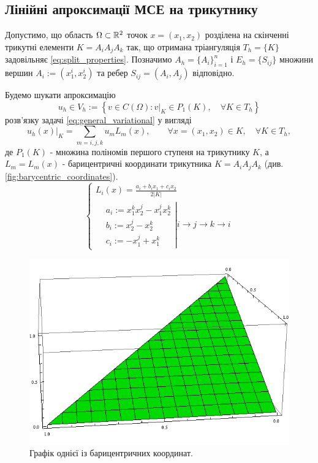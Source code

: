 \subsection{Лінійні апроксимації МСЕ на трикутнику}

Допустимо, що область $\Omega \subset \mathbb{R}^2$ точок $x = (x_1, x_2)$ розділена на скінченні трикутні елементи $K = A_iA_jA_k$
	так, що отримана тріангуляція $T_h = \lbrace K \rbrace$ задовільняє
\eqref{eq:split_properties}.
Позначимо $A_h = \lbrace A_i \rbrace_{i=1}^n$ і $E_h = \lbrace S_{ij} \rbrace$ множини вершин $A_i := (x_1^i, x_2^i)$ та ребер $S_{ij} = (A_i, A_j)$ відповідно.

Будемо шукати апроксимацію
\begin{equation}
	u_h \in V_h := \left\lbrace v \in C(\Omega) : v|_K \in P_1(K), \quad \forall K \in T_h \right\rbrace
\end{equation}
%
розв'язку задачі \eqref{eq:general_variational} у вигляді
%
\begin{equation}\label{eq:appr_kind}
	u_h(x)|_K = \sum \limits_{m=i,j,k} u_m L_m (x), \qquad \forall x=(x_1, x_2) \in K, \quad \forall K \in T_h,
\end{equation}
%
де $P_1(K)$ - множина поліномів першого ступеня на трикутнику $K$, а $L_m = L_m(x)$ -
	барицентричні координати трикутника $K = A_i A_j A_k$ (див. \autoref{fig:barycentric_coordinates}).
%
\begin{equation}\label{eq:barycentric_coord}
	\begin{cases}
		L_i(x) = \frac{a_i + b_i x_1 + c_i x_2}{2 |K|} \\
			\left.
			\begin{split}
				&a_i := x_1^k x_2^j - x_1^j x_2^k \\
				&b_i := x_2^j -x_2^k \\
				&c_i := -x_1^j+x_1^k
			\end{split}
			\right|
			i \to j \to k \to i
	\end{cases}
\end{equation}
%
\begin{figure}[H]
	\centering
    \includegraphics[width=\textwidth]{images/barycentric}
    \caption{Графік однієї із барицентричних координат.}
    \label{fig:barycentric_coordinates}
\end{figure}
